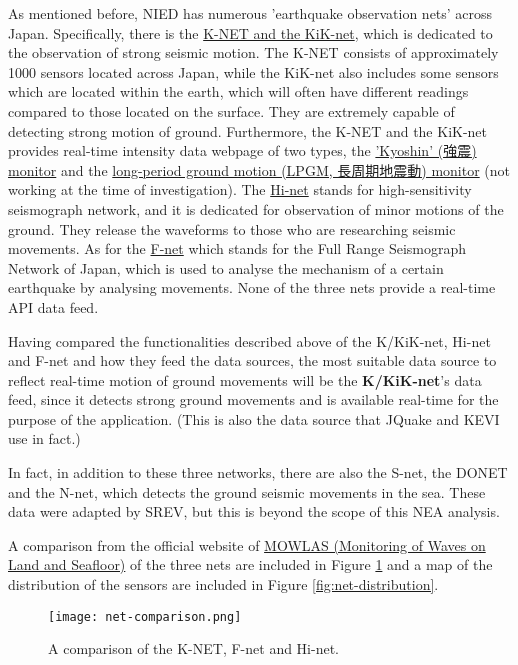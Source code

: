 As mentioned before, NIED has numerous 'earthquake observation nets' across Japan. Specifically, there is the \href{https://www.kyoshin.bosai.go.jp/kyoshin/}{K-NET and the KiK-net}, which is dedicated to the observation of strong seismic motion. The K-NET consists of approximately 1000 sensors located across Japan, while the KiK-net also includes some sensors which are located within the earth, which will often have different readings compared to those located on the surface. They are extremely capable of detecting strong motion of ground. Furthermore, the K-NET and the KiK-net provides real-time intensity data webpage of two types, the \href{http://www.kmoni.bosai.go.jp}{'Kyoshin' (強震) monitor} and the \href{https://www.lmoni.bosai.go.jp/monitor/}{long-period ground motion (LPGM, 長周期地震動) monitor} (not working at the time of investigation). The \href{https://www.hinet.bosai.go.jp/?LANG=ja}{Hi-net} stands for high-sensitivity seismograph network, and it is dedicated for observation of minor motions of the ground. They release the waveforms to those who are researching seismic movements. As for the \href{https://www.fnet.bosai.go.jp/freesia/top.php?LANG=ja}{F-net} which stands for the Full Range Seismograph Network of Japan, which is used to analyse the mechanism of a certain earthquake by analysing movements. None of the three nets provide a real-time API data feed.

Having compared the functionalities described above of the K/KiK-net, Hi-net and F-net and how they feed the data sources, the most suitable data source to reflect real-time motion of ground movements will be the \textbf{K/KiK-net}'s data feed, since it detects strong ground movements and is available real-time for the purpose of the application. (This is also the data source that JQuake and KEVI use in fact.)

In fact, in addition to these three networks, there are also the S-net, the DONET and the N-net, which detects the ground seismic movements in the sea. These data were adapted by SREV, but this is beyond the scope of this NEA analysis.

A comparison from the official website of \href{https://www.mowlas.bosai.go.jp}{MOWLAS (Monitoring of Waves on Land and Seafloor)} of the three nets are included in Figure \ref{fig:net-comparison} and a map of the distribution of the sensors are included in Figure \ref{fig:net-distribution}.

\begin{figure}[!ht]
    \centering
    \texttt{[image: net-comparison.png]}
    \caption{A comparison of the K-NET, F-net and Hi-net.}
    \label{fig:net-comparison}
\end{figure}

